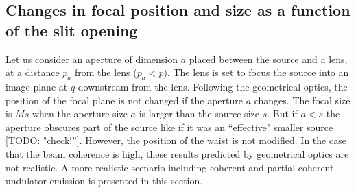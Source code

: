 \documentclass{iucr}              %
\newcommand{\todo}[1]{{\color{red}[TODO: "#1'']}}
\begin{document}
 
 \subsection{Changes in focal position and size as a function of the slit opening}
 
Let us consider an aperture of dimension $a$ placed between the source and a lens, at a distance $p_a$ from the lens ($p_a < p$). The lens is set to focus the source into an image plane at $q$ downstream from the lens. Following the geometrical optics, the position of the focal plane is not changed if the aperture $a$ changes. The focal size is $Ms$  when the aperture size $a$ is larger than the source size $s$. But if $a<s$ the aperture obscures part of the source like if it was an ``effective" smaller source \todo{check!}. However, the position of the waist is not modified. In the case that the beam coherence is high, these results predicted by geometrical optics are not realistic. A more realistic scenario including coherent and partial coherent undulator emission is presented in this section. 


\end{document}
